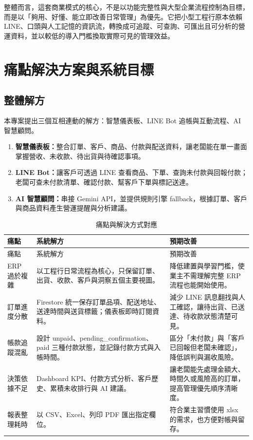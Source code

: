 \documentclass[12pt,a4paper,UTF8,fontset=none]{ctexart}
\newcommand{\code}[1]{{\ttfamily\small #1}}
\begin{document}
整體而言，這套商業模式的核心，不是以功能完整性與大型企業流程控制為目標，而是以「夠用、好懂、能立即改善日常管理」為優先。它把小型工程行原本依賴 LINE、口頭與人工記憶的資訊流，轉換成可追蹤、可查詢、可匯出且可分析的營運資料，並以較低的導入門檻換取實際可見的管理效益。

\section{痛點解決方案與系統目標}

\subsection{整體解方}

本專案提出三個互相連動的解方：智慧儀表板、LINE Bot 追帳與互動流程、AI 智慧顧問。

\begin{enumerate}
  \item \textbf{智慧儀表板：}整合訂單、客戶、商品、付款與配送資料，讓老闆能在單一畫面掌握營收、未收款、待出貨與待確認事項。
  \item \textbf{LINE Bot：}讓客戶可透過 LINE 查看商品、下單、查詢未付款與回報付款；老闆可查未付款清單、確認付款、幫客戶下單與標記送達。
  \item \textbf{AI 智慧顧問：}串接 Gemini API，並提供規則引擎 fallback，根據訂單、客戶與商品資料產生營運提醒與分析建議。
\end{enumerate}

\begin{longtable}{L{3.2cm}L{4.7cm}L{5.7cm}}
  \caption{痛點與解決方式對應} \\
  \toprule
  痛點 & 系統解方 & 預期改善 \\
  \midrule
  \endfirsthead
  \toprule
  痛點 & 系統解方 & 預期改善 \\
  \midrule
  \endhead
  ERP 過於複雜 & 以工程行日常流程為核心，只保留訂單、出貨、收款、客戶與洞察五個主要視圖。 & 降低建置與學習門檻，使業主不需理解完整 ERP 流程也能開始使用。 \\
  訂單進度分散 & Firestore 統一保存訂單品項、配送地址、送達時間與送貨標籤；儀表板即時訂閱資料。 & 減少 LINE 訊息翻找與人工確認，讓待出貨、已送達、待收款狀態清楚可見。 \\
  帳款追蹤混亂 & 設計 \code{unpaid}、\code{pending\_confirmation}、\code{paid} 三種付款狀態，並記錄付款方式與入帳時間。 & 區分「未付款」與「客戶已回報但老闆未確認」，降低誤判與漏收風險。 \\
  決策依據不足 & Dashboard KPI、付款方式分析、客戶歷史、累積未收排行與 AI 建議。 & 讓老闆能先處理金額大、時間久或風險高的訂單，提高管理優先順序清晰度。 \\
  報表整理耗時 & 以 CSV、Excel、列印 PDF 匯出指定欄位。 & 符合業主習慣使用 xlsx 的需求，也方便對帳與留存。 \\
  \bottomrule
\end{longtable}
\end{document}
